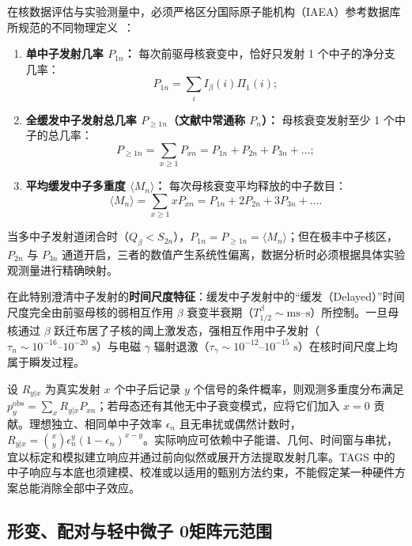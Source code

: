 在核数据评估与实验测量中，必须严格区分国际原子能机构（IAEA）参考数据库所规范的不同物理定义~\cite{dimitriou-2021-iaea-beta-delayed-neutron-database}：
\begin{enumerate}
\item \textbf{单中子发射几率 $P_{1n}$：} 每次前驱母核衰变中，恰好只发射 1 个中子的净分支几率：
\begin{equation}\label{eq:4-7-P1n-def}
P_{1n} = \sum_{i} I_\beta(i) \Pi_1(i);
\end{equation}
\item \textbf{全缓发中子发射总几率 $P_{\ge 1n}$（文献中常通称 $P_n$）：} 母核衰变发射至少 1 个中子的总几率：
\begin{equation}\label{eq:4-7-P-atleast-1n-def}
P_{\ge 1n} = \sum_{x \ge 1} P_{xn} = P_{1n} + P_{2n} + P_{3n} + \dots;
\end{equation}
\item \textbf{平均缓发中子多重度 $\langle M_n \rangle$：} 每次母核衰变平均释放的中子数目：
\begin{equation}\label{eq:4-7-mean-multiplicity-def}
\langle M_n \rangle = \sum_{x \ge 1} x P_{xn} = P_{1n} + 2 P_{2n} + 3 P_{3n} + \dots.
\end{equation}
\end{enumerate}
当多中子发射道闭合时（$Q_\beta < S_{2n}$），$P_{1n} = P_{\ge 1n} = \langle M_n \rangle$；但在极丰中子核区，$P_{2n}$ 与 $P_{3n}$ 通道开启，三者的数值产生系统性偏离，数据分析时必须根据具体实验观测量进行精确映射。

在此特别澄清中子发射的\textbf{时间尺度特征}：缓发中子发射中的“缓发（Delayed）”时间尺度完全由前驱母核的弱相互作用 $\beta$ 衰变半衰期（$T_{1/2}^\beta \sim \text{ms--s}$）所控制。一旦母核通过 $\beta$ 跃迁布居了子核的阈上激发态，强相互作用中子发射（$\tau_n \sim 10^{-16}\text{--}10^{-20}\text{ s}$）与电磁 $\gamma$ 辐射退激（$\tau_\gamma \sim 10^{-12}\text{--}10^{-15}\text{ s}$）在核时间尺度上均属于瞬发过程。

设 $R_{y|x}$ 为真实发射 $x$ 个中子后记录 $y$ 个信号的条件概率，则观测多重度分布满足 $p_y^{\mathrm{obs}} = \sum_x R_{y|x} P_{xn}$；若母态还有其他无中子衰变模式，应将它们加入 $x=0$ 贡献。理想独立、相同单中子效率 $\epsilon_n$ 且无串扰或偶然计数时，$R_{y|x} = \binom{x}{y} \epsilon_n^y (1 - \epsilon_n)^{x-y}$。实际响应可依赖中子能谱、几何、时间窗与串扰，宜以标定和模拟建立响应并通过前向似然或展开方法提取发射几率。TAGS 中的中子响应与本底也须建模、校准或以适用的甄别方法约束，不能假定某一种硬件方案总能消除全部中子效应。

\subsection{形变、配对与轻中微子 0\nu\beta\beta 矩阵元范围}\label{sec:4-7-3}

